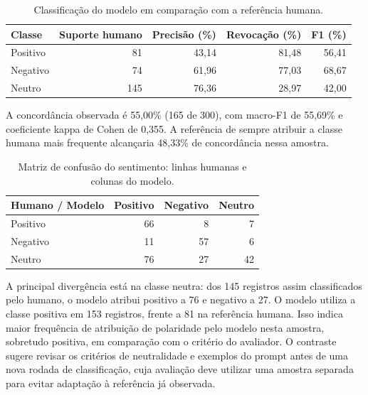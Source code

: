 \begin{table}[H]\centering\caption{Classificação do modelo em comparação com a referência humana.}

\begin{tabular}{lrrrr}\hline Classe & Suporte humano & Precisão (\%) & Revocação (\%) & F1 (\%) \\ \hline

Positivo & 81 & 43,14 & 81,48 & 56,41 \\

Negativo & 74 & 61,96 & 77,03 & 68,67 \\

Neutro & 145 & 76,36 & 28,97 & 42,00 \\

\hline\end{tabular}\par{}\end{table}

A concordância observada é 55,00\% (165 de 300), com macro-F1 de 55,69\% e coeficiente kappa de Cohen de 0,355. A referência de sempre atribuir a classe humana mais frequente alcançaria 48,33\% de concordância nessa amostra.

\begin{table}[H]\centering\caption{Matriz de confusão do sentimento: linhas humanas e colunas do modelo.}

\begin{tabular}{lrrr}\hline Humano / Modelo & Positivo & Negativo & Neutro \\ \hline

Positivo & 66 & 8 & 7\\

Negativo & 11 & 57 & 6\\

Neutro & 76 & 27 & 42\\

\hline\end{tabular}\par{}\end{table}

A principal divergência está na classe neutra: dos 145 registros assim classificados pelo humano, o modelo atribui positivo a 76 e negativo a 27. O modelo utiliza a classe positiva em 153 registros, frente a 81 na referência humana. Isso indica maior frequência de atribuição de polaridade pelo modelo nesta amostra, sobretudo positiva, em comparação com o critério do avaliador. O contraste sugere revisar os critérios de neutralidade e exemplos do prompt antes de uma nova rodada de classificação, cuja avaliação deve utilizar uma amostra separada para evitar adaptação à referência já observada.

